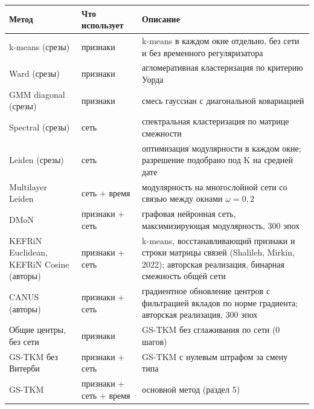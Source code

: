 \documentclass[11pt,a4paper]{article}
\newcounter{none}\def\LTcaptype{none}
\begin{document}
\begingroup\small\setlength{\tabcolsep}{4pt}

{\def\LTcaptype{none} %
\begin{longtable}[]{@{}
  >{\raggedright\arraybackslash}p{}
  >{\raggedright\arraybackslash}p{}
  >{\raggedright\arraybackslash}p{}@{}}
\toprule\noalign{}
\begin{minipage}[b]{\linewidth}\raggedright
Метод
\end{minipage} & \begin{minipage}[b]{\linewidth}\raggedright
Что использует
\end{minipage} & \begin{minipage}[b]{\linewidth}\raggedright
Описание
\end{minipage} \\
\midrule\noalign{}
\endhead
\bottomrule\noalign{}
\endlastfoot
k-means (срезы) & признаки & k-means в каждом окне отдельно, без сети и без временного регуляризатора \\
Ward (срезы) & признаки & агломеративная кластеризация по критерию Уорда \\
GMM diagonal (срезы) & признаки & смесь гауссиан с диагональной ковариацией \\
Spectral (срезы) & сеть & спектральная кластеризация по матрице смежности \\
Leiden (срезы) & сеть & оптимизация модулярности в каждом окне; разрешение подобрано под K на средней дате \\
Multilayer Leiden & сеть + время & модулярность на многослойной сети со связью между окнами \(\omega = 0{,}2\) \\
DMoN & признаки + сеть & графовая нейронная сеть, максимизирующая модулярность, 300 эпох \\
KEFRiN Euclidean, KEFRiN Cosine (авторы) & признаки + сеть & k-means, восстанавливающий признаки и строки матрицы связей (Shalileh, Mirkin, 2022); авторская реализация, бинарная смежность общей сети \\
CANUS (авторы) & признаки + сеть & градиентное обновление центров с фильтрацией вкладов по норме градиента; авторская реализация, 300 эпох \\
Общие центры, без сети & признаки & GS-TKM без сглаживания по сети (0 шагов) \\
GS-TKM без Витерби & признаки + сеть & GS-TKM с нулевым штрафом за смену типа \\
GS-TKM & признаки + сеть + время & основной метод (раздел 5) \\
\end{longtable}
}
\end{document}
